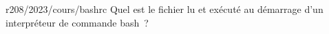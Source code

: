 \begin{question}{r208/2023/cours/bashrc}
Quel est le fichier lu et exécuté au démarrage d'un interpréteur
de commande bash~?
%
\begin{reponses}
\end{reponses}
\end{question}
